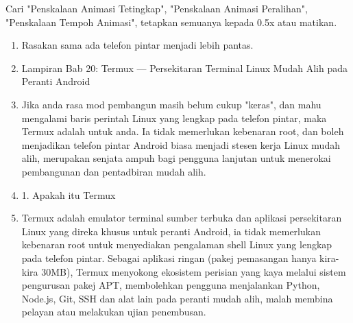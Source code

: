 \begin{tcbpractice}{Cari "Penskalaan Animasi Tetingkap", "Penskalaan Animasi Peralihan", "Penskalaan Tempoh Animasi", tetapkan semuanya kepada 0.5x atau matikan.}
\begin{enumerate}
  \item Rasakan sama ada telefon pintar menjadi lebih pantas.
  \item Lampiran Bab 20: Termux — Persekitaran Terminal Linux Mudah Alih pada Peranti Android
  \item Jika anda rasa mod pembangun masih belum cukup "keras", dan mahu mengalami baris perintah Linux yang lengkap pada telefon pintar, maka Termux adalah untuk anda. Ia tidak memerlukan kebenaran root, dan boleh menjadikan telefon pintar Android biasa menjadi stesen kerja Linux mudah alih, merupakan senjata ampuh bagi pengguna lanjutan untuk menerokai pembangunan dan pentadbiran mudah alih.
  \item 1. Apakah itu Termux
  \item Termux adalah emulator terminal sumber terbuka dan aplikasi persekitaran Linux yang direka khusus untuk peranti Android, ia tidak memerlukan kebenaran root untuk menyediakan pengalaman shell Linux yang lengkap pada telefon pintar. Sebagai aplikasi ringan (pakej pemasangan hanya kira-kira 30MB), Termux menyokong ekosistem perisian yang kaya melalui sistem pengurusan pakej APT, membolehkan pengguna menjalankan Python, Node.js, Git, SSH dan alat lain pada peranti mudah alih, malah membina pelayan atau melakukan ujian penembusan.
\end{enumerate}

\end{tcbpractice}
